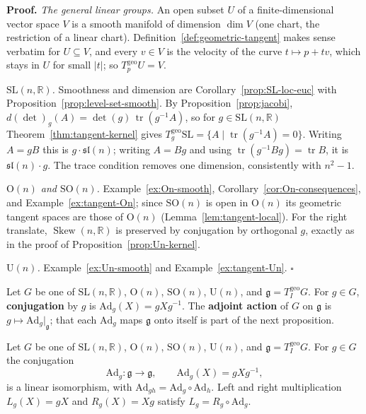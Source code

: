 \documentclass[11pt]{report}
\makeatletter
\newcounter{defcounter}[section]
\newcounter{thmcounter}[section]
\renewenvironment{proof}[1][Proof]{\noindent\textbf{#1.} }{\hfill$\square$\par\vspace{5pt}}
\newcommand{\thmlabel}[1]{\edef\@currentlabel{\arabic{section}.\arabic{thmcounter}}\label{#1}}
\newcommand{\deflabel}[1]{\edef\@currentlabel{\arabic{section}.\arabic{defcounter}}\label{#1}}
\newcommand{\SL}{\mathrm{SL}}
\newcommand{\Ogp}{\mathrm{O}}
\newcommand{\SO}{\mathrm{SO}}
\newcommand{\Ugp}{\mathrm{U}}
\DeclareMathOperator{\tr}{tr}
\DeclareMathOperator{\Skew}{Skew}
\newcommand{\geo}{\mathrm{geo}}
\makeatother
\begin{document}
\begin{proof}
\emph{The general linear groups.} An open subset $U$ of a finite-dimensional vector space $V$ is a smooth manifold of dimension $\dim V$ (one chart, the restriction of a linear chart). Definition~\ref{def:geometric-tangent} makes sense verbatim for $U \subseteq V$, and every $v \in V$ is the velocity of the curve $t \mapsto p + tv$, which stays in $U$ for small $|t|$; so $T^{\geo}_pU = V$.

\emph{$\SL(n,\mathbb{R})$.} Smoothness and dimension are Corollary~\ref{prop:SL-loc-euc} with Proposition~\ref{prop:level-set-smooth}. By Proposition~\ref{prop:jacobi}, $d(\det)_g(A) = \det(g)\,\tr(g^{-1}A)$, so for $g \in \SL(n,\mathbb{R})$ Theorem~\ref{thm:tangent-kernel} gives $T^{\geo}_g\SL = \{A \mid \tr(g^{-1}A) = 0\}$. Writing $A = gB$ this is $g\cdot\mathfrak{sl}(n)$; writing $A = Bg$ and using $\tr(g^{-1}Bg) = \tr B$, it is $\mathfrak{sl}(n)\cdot g$. The trace condition removes one dimension, consistently with $n^2 - 1$.

\emph{$\Ogp(n)$ and $\SO(n)$.} Example~\ref{ex:On-smooth}, Corollary~\ref{cor:On-consequences}, and Example~\ref{ex:tangent-On}; since $\SO(n)$ is open in $\Ogp(n)$ its geometric tangent spaces are those of $\Ogp(n)$ (Lemma~\ref{lem:tangent-local}). For the right translate, $\Skew(n,\mathbb{R})$ is preserved by conjugation by orthogonal $g$, exactly as in the proof of Proposition~\ref{prop:Un-kernel}.

\emph{$\Ugp(n)$.} Example~\ref{ex:Un-smooth} and Example~\ref{ex:tangent-Un}.
\end{proof}

\begin{defbox}\deflabel{def:adjoint}
Let $G$ be one of $\SL(n,\mathbb{R})$, $\Ogp(n)$, $\SO(n)$, $\Ugp(n)$, and $\mathfrak{g} = T^{\geo}_I G$. For $g \in G$, \textbf{conjugation} by $g$ is $\mathrm{Ad}_g(X) = gXg^{-1}$. The \textbf{adjoint action} of $G$ on $\mathfrak{g}$ is $g \mapsto \mathrm{Ad}_g|_{\mathfrak{g}}$; that each $\mathrm{Ad}_g$ maps $\mathfrak{g}$ onto itself is part of the next proposition.
\end{defbox}

\begin{propbox}\thmlabel{prop:adjoint}
Let $G$ be one of $\SL(n,\mathbb{R})$, $\Ogp(n)$, $\SO(n)$, $\Ugp(n)$, and $\mathfrak{g} = T^{\geo}_I G$. For $g \in G$ the conjugation
\[
\mathrm{Ad}_g : \mathfrak{g} \to \mathfrak{g}, \qquad \mathrm{Ad}_g(X) = gXg^{-1},
\]
is a linear isomorphism, with $\mathrm{Ad}_{gh} = \mathrm{Ad}_g \circ \mathrm{Ad}_h$. Left and right multiplication $L_g(X) = gX$ and $R_g(X) = Xg$ satisfy $L_g = R_g \circ \mathrm{Ad}_g$.
\end{propbox}
\end{document}
